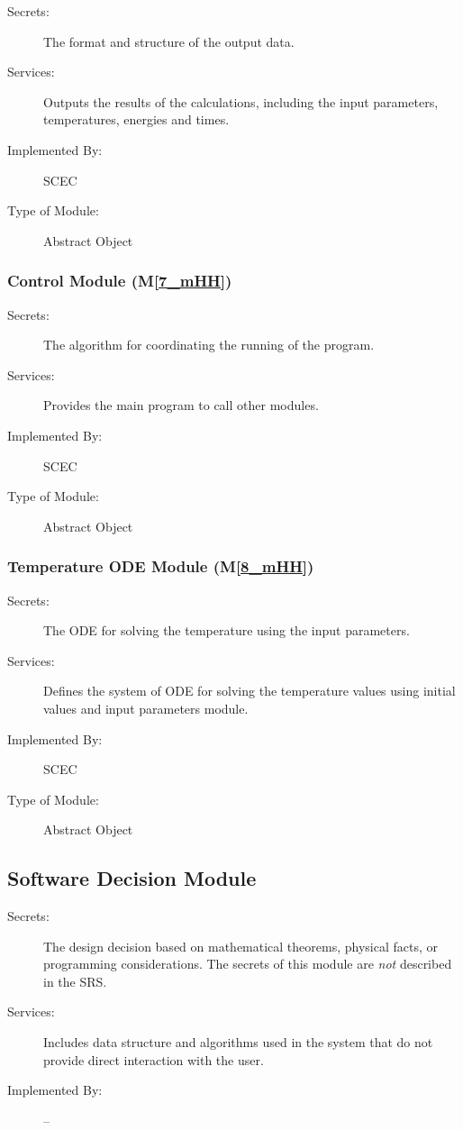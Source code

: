 \documentclass[12pt, titlepage]{article}
\newcommand{\mref}[1]{M\ref{#1}}
\begin{document}
\begin{description}
\item[Secrets:] The format and structure of the output data.
\item[Services:] Outputs the results of the calculations, including the input parameters, temperatures, energies and times.
\item[Implemented By:] SCEC
\item[Type of Module:] Abstract Object
\end{description}

\subsubsection{Control Module (\mref{7_mHH})}

\begin{description}
\item[Secrets:] The algorithm for coordinating the running of the program.
\item[Services:] Provides the main program to call other modules. 
\item[Implemented By:] SCEC
\item[Type of Module:] Abstract Object
\end{description}

\subsubsection{Temperature ODE Module (\mref{8_mHH})}

\begin{description}
\item[Secrets:] The ODE for solving the temperature using the input parameters.
\item[Services:] Defines the system of ODE for solving the temperature values using initial values and input parameters module. 
\item[Implemented By:] SCEC
\item[Type of Module:] Abstract Object
\end{description}


\subsection{Software Decision Module}

\begin{description}
\item[Secrets:] The design decision based on mathematical theorems, physical
  facts, or programming considerations. The secrets of this module are
  \emph{not} described in the SRS.
\item[Services:] Includes data structure and algorithms used in the system that
  do not provide direct interaction with the user. 
\item[Implemented By:] --
\end{description}
\end{document}

